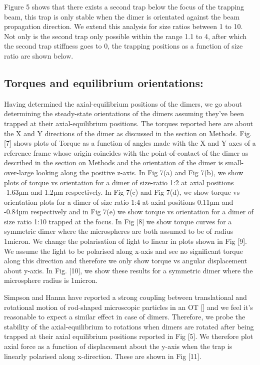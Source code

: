 \documentclass[preprint,  3p]{elsarticle}
\begin{document}
Figure 5 shows that there exists a second trap below the focus of the trapping beam, this trap is only stable when the dimer is orientated against the beam propagation direction. We extend this analysis for size ratios between 1 to 10. Not only is the second trap only possible within the range 1.1 to 4, after which the second trap stiffness goes to 0, the trapping positions as a function of size ratio are shown below.

\subsection{Torques and equilibrium orientations:}
Having determined the axial-equilibrium positions of the dimers, we go about determining the steady-state orientations of the dimers assuming they’ve been trapped at their axial-equilibrium positions. The torques reported here are about the X and Y directions of the dimer as discussed in the section on Methods. Fig. [7] shows plots of Torque as a function of angles made with the X and Y axes of a reference frame whose origin coincides with the point-of-contact of the dimer as described in the section on Methods and the orientation of the dimer is small-over-large looking along the positive z-axis. In Fig 7(a) and Fig 7(b), we show plots of torque vs orientation for a dimer of size-ratio 1:2 at axial positions -1.63µm and 1.2µm respectively. In Fig 7(c) and Fig 7(d), we show torque vs orientation plots for a dimer of size ratio 1:4 at axial positions 0.11µm and -0.84µm respectively and in Fig 7(e) we show torque vs orientation for a dimer of size ratio 1:10 trapped at the focus. In Fig [8] we show torque curves for a symmetric dimer where the microspheres are both assumed to be of radius 1micron. We change the polarisation of light to linear in plots shown in Fig [9]. We assume the light to be polarised along x-axis and see no significant torque along this direction and therefore we only show torque vs angular displacement about y-axis. In Fig. [10], we show these results for a symmetric dimer where the microsphere radius is 1micron. 

Simpson and Hanna have reported a strong coupling between translational and rotational motion of rod-shaped microscopic particles in an OT [] and we feel it’s reasonable to expect a similar effect in case of dimers. Therefore, we probe the stability of the axial-equilibrium to rotations when dimers are rotated after being trapped at their axial equilibrium positions reported in Fig [5]. We therefore plot axial force as a function of displacement about the y-axis when the trap is linearly polarised along x-direction. These are shown in Fig [11]. 
\end{document}
